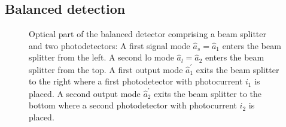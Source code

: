 \subsection{Balanced detection}


\begin{figure}[htb]
    \centering
    
    \caption{Optical part of the balanced detector comprising a beam splitter and two photodetectors: A first signal mode $\hat{a}_s=\hat{a}_1$ enters the beam splitter from the left. A second \gls{lo} mode $\hat{a}_l=\hat{a}_2$ enters the beam splitter from the top. A first output mode $\hat{a}_1^\prime$ exits the beam splitter to the right where a first photodetector with photocurrent $i_1$ is placed. A second output mode $\hat{a}_2^\prime$ exits the beam splitter to the bottom where a second photodetector with photocurrent $i_2$ is placed.}\label{fig:balanced_detector_optics}
\end{figure}

